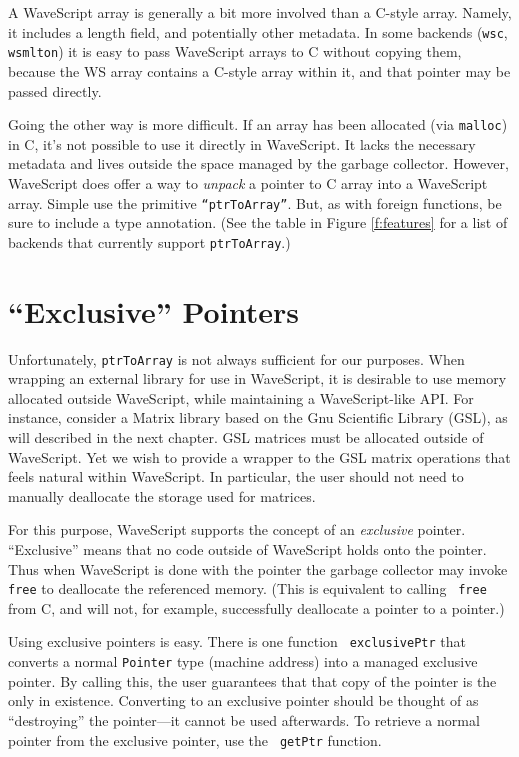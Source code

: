 A WaveScript array is generally a bit more involved than a C-style
array.  Namely, it includes a length field, and potentially other
metadata.  In some backends ({\tt wsc}, {\tt wsmlton}) it is easy to
pass WaveScript arrays to C without copying them, because the WS array
contains a C-style array within it, and that pointer may be passed
directly.

Going the other way is more difficult.  If an array has been allocated
(via {\tt malloc}) in C, it's not possible to use it directly in
WaveScript.  It lacks the necessary metadata and lives outside the
space managed by the garbage collector.  However, WaveScript does
offer a way to {\em unpack} a pointer to C array into a WaveScript
array.  Simple use the primitive {\tt ``ptrToArray''}. But, as with
foreign functions, be sure to include a type annotation.  (See the
table in Figure \ref{f:features} for a list of backends that currently
support {\tt ptrToArray}.)

\section{``Exclusive'' Pointers}

Unfortunately, {\tt ptrToArray} is not always sufficient for our
purposes.  When wrapping an external library for use in WaveScript, it
is desirable to use memory allocated outside WaveScript, while
maintaining a WaveScript-like API.  For instance, consider a Matrix
library based on the Gnu Scientific Library (GSL), as will described in the
next chapter.  GSL matrices must be allocated outside of WaveScript.
Yet we wish to provide a wrapper to the GSL matrix operations that
feels natural within WaveScript.  In particular, the user should not
need to manually deallocate the storage used for matrices.

For this purpose, WaveScript supports the concept of an {\em
  exclusive} pointer.  ``Exclusive'' means that no code outside of
WaveScript holds onto the pointer.  Thus when WaveScript is done
with the pointer the garbage collector may invoke {\tt free} to
deallocate the referenced memory.  (This is equivalent to calling {\tt
  free} from C, and will not, for example, successfully deallocate a
  pointer to a pointer.)

Using exclusive pointers is easy.  There is one function {\tt
  exclusivePtr} that converts a normal {\tt Pointer} type (machine
  address) into a managed exclusive pointer.  By calling this, the
  user guarantees that that copy of the pointer is the only in
  existence.  Converting to an exclusive pointer should be thought of
  as ``destroying'' the pointer---it cannot be used afterwards.  To
  retrieve a normal pointer from the exclusive pointer, use the {\tt
  getPtr} function.  

